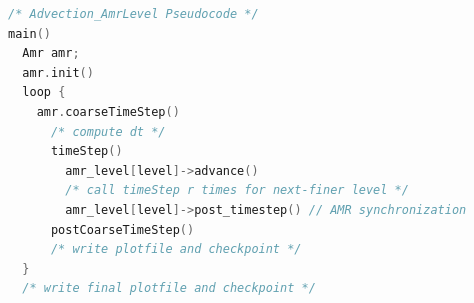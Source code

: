 \begin{lstlisting}[language=cpp]
/* Advection_AmrLevel Pseudocode */
main()
  Amr amr;
  amr.init()
  loop { 
    amr.coarseTimeStep()
      /* compute dt */
      timeStep()
        amr_level[level]->advance()
        /* call timeStep r times for next-finer level */
        amr_level[level]->post_timestep() // AMR synchronization
      postCoarseTimeStep()
      /* write plotfile and checkpoint */
  }
  /* write final plotfile and checkpoint */
\end{lstlisting}
